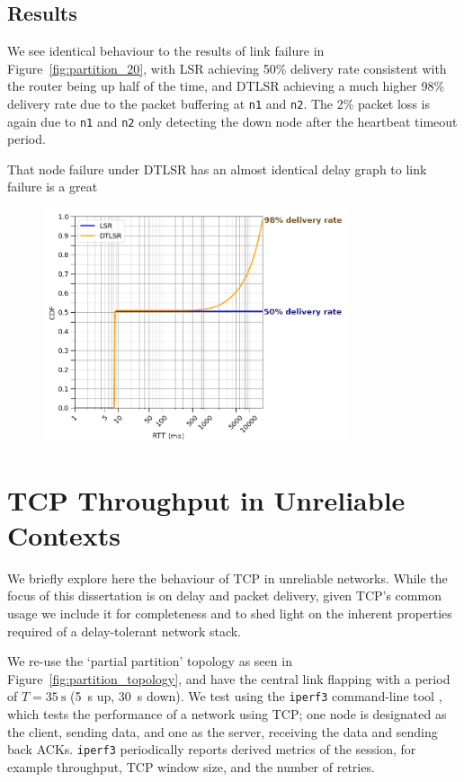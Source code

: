 \documentclass[withindex,glossary,openany]{cam-thesis}
\begin{document}
\subsection{Results}

We see identical behaviour to the results of link failure in Figure~\ref{fig:partition_20}, with LSR achieving 50\% delivery rate consistent with the router being up half of the time, and DTLSR achieving a much higher 98\% delivery rate due to the packet buffering at \texttt{n1} and \texttt{n2}. The 2\% packet loss is again due to \texttt{n1} and \texttt{n2} only detecting the down node after the heartbeat timeout period.

That node failure under DTLSR has an almost identical delay graph to link failure is a great

\begin{figure}[H] \centering
	\includegraphics[width=0.8\textwidth]{delay_node_flap20}
	\label{fig:delay_node_flap20}
\end{figure}




\section{TCP Throughput in Unreliable Contexts}
\label{sec:tcp}

We briefly explore here the behaviour of TCP in unreliable networks. While the focus of this dissertation is on delay and packet delivery, given TCP's common usage we include it for completeness and to shed light on the inherent properties required of a delay-tolerant network stack.

We re-use the `partial partition' topology as seen in Figure~\ref{fig:partition_topology}, and have the central link flapping with a period of $T=\SI{35}{\s}$ (\SI{5}{\s} up, \SI{30}{\s} down). We test using the \texttt{iperf3} command-line tool \cite{IPERF}, which tests the performance of a network using TCP; one node is designated as the client, sending data, and one as the server, receiving the data and sending back ACKs. \texttt{iperf3} periodically reports derived metrics of the session, for example throughput, TCP window size, and the number of retries.
\end{document}
